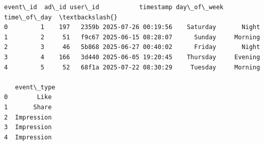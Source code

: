 \documentclass[11pt]{article}
\makeatletter
\newcommand{\boxspacing}{\kern\kvtcb@left@rule\kern\kvtcb@boxsep}
\newcommand{\prompt}[4]{
        {\ttfamily\llap{{\color{#2}[#3]:\hspace{3pt}#4}}\vspace{-\baselineskip}}
    }
\makeatother
\begin{document}
            \begin{tcolorbox}[breakable, size=fbox, boxrule=.5pt, pad at break*=1mm, opacityfill=0]
\prompt{Out}{outcolor}{7}{\boxspacing}
\begin{Verbatim}[commandchars=\\\{\}]
   event\_id  ad\_id user\_id           timestamp day\_of\_week time\_of\_day  \textbackslash{}
0         1    197   2359b 2025-07-26 00:19:56    Saturday       Night
1         2     51   f9c67 2025-06-15 08:28:07      Sunday     Morning
2         3     46   5b868 2025-06-27 00:40:02      Friday       Night
3         4    166   3d440 2025-06-05 19:20:45    Thursday     Evening
4         5     52   68f1a 2025-07-22 08:30:29     Tuesday     Morning

   event\_type
0        Like
1       Share
2  Impression
3  Impression
4  Impression
\end{Verbatim}
\end{tcolorbox}
        
\end{document}
